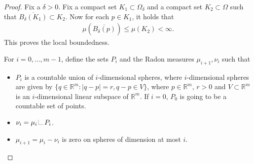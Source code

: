\documentclass[10pt,a4paper]{amsart}
\newcommand{\LL}{{\mathchoice
{\,\LM7\,}{\,\LM7\,}{\,\LM5\,}{\,\LM{3.35}\,}}}
\newcommand{\LM}[1]{\hbox{\vrule width.2pt \vbox to#1pt{\vfill \hrule
width#1pt height.2pt}}}
\newcommand{\R}{\mathbb{R}}
\begin{document}
\begin{proof}
    Fix a $\delta>0$. 
    Fix a compact set $K_1 \subset \Omega_\delta$ and a compact set $K_2 \subset \Omega$ such that $\overline{B_\delta(K_1)} \subset K_2$. Now for each $p \in K_1$, it holds that 
    \begin{align*}
        \mu(\overline{B_\delta(p)}) \leq \mu(K_2) < \infty.
    \end{align*}
    This proves the local boundedness. 

    For $i=0, \ldots, m-1$, define the sets $P_{i}$ and the Radon measures $\mu_{i+1}, \nu_{i}$ such that 
    \begin{itemize}
        \item $P_{i}$ is a countable union of $i$-dimensional spheres, where $i$-dimensional spheres are given by $\{q \in \R^m: |q-p|=r, q-p \in V\}$, where $p \in \R^m$, $r>0$ and $V \subset \R^m$ is an $i$-dimensional linear subspace of $\R^m$. If $i=0$, $P_0$ is going to be a countable set of points.
        \item $\nu_{i}= \mu_{i}\LL P_{i}$.
        \item $\mu_{i+1} = \mu_{i}-\nu_{i}$ is zero on spheres of dimension at most $i$.
    \end{itemize}


\end{proof}
\end{document}
